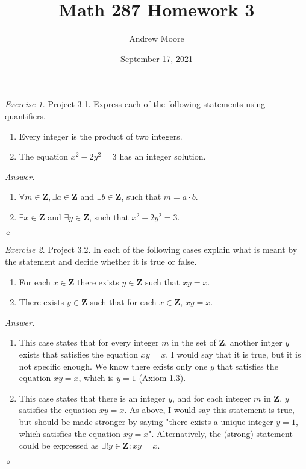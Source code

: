 \documentclass[12pt,oneside]{amsart}
\title{Math 287 Homework 3}
\author{Andrew Moore}
\date{September 17, 2021} %
\theoremstyle{remark}
\newtheorem{exer}{Exercise}
\newcommand{\bfZ}{\mathbf{Z}}
\newenvironment{answer}{\bigskip\noindent\emph{Answer.}}{\hfill$\diamond$\newline}
\begin{document}
\maketitle

%
%
%
%

\newpage
\begin{exer}
Project 3.1. Express each of the following statements using quantifiers.
\begin{enumerate}[label={(\roman*)},start={3}]
\item Every integer is the product of two integers.
\item The equation $x^2-2y^2 = 3$ has an integer solution.
\end{enumerate}
\end{exer}

\begin{answer}
\begin{enumerate}[label={(\roman*)},start={3}]
\item $\forall m \in \bfZ, \exists a \in \bfZ$ and $\exists b \in \bfZ$, such that $m = a \cdot b$.
\item $\exists x \in \bfZ$ and $\exists y \in \bfZ$, such that $x^2 - 2y^2 = 3$.
\end{enumerate}
\end{answer}

%
%
%
%

\newpage
\begin{exer}
Project 3.2. In each of the following cases explain what is meant by the statement and decide whether it is true or false.
\begin{enumerate}[label={(\roman*)},start={3}]
\item For each $x \in \mathbf{Z}$ there exists $y \in \mathbf{Z}$ such that $xy=x$.
\item There exists $y \in \mathbf{Z}$ such that for each $x \in \mathbf{Z}$, $xy=x$.
\end{enumerate}
\end{exer}

\begin{answer}
\begin{enumerate}[label={(\roman*)},start={3}]
\item This case states that for every integer $m$ in the set of $\bfZ$, another intger $y$ exists that satisfies the equation $xy = x$. I would say that it is true, but it is not specific enough. We know there exists only one $y$ that satisfies the equation $xy = x$, which is $y = 1$ (Axiom 1.3).
\item This case states that there is an integer $y$, and for each integer $m$ in $\bfZ$, $y$ satisfies the equation $xy = x$. As above, I would say this statement is true, but should be made stronger by saying "there exists a unique integer $y = 1$, which satisfies the equation $xy = x$". Alternatively, the (strong) statement could be expressed as $\exists!y \in \bfZ \colon xy = x$.
\end{enumerate}
\end{answer}
\end{document}
